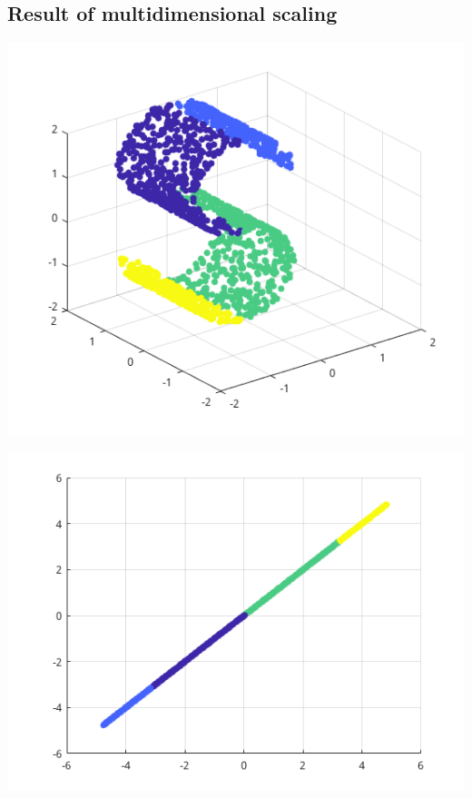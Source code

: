 \documentclass[a0,portrait]{a0poster}
\begin{document}
\begin{multicols}{3}
    \subsection*{Result of multidimensional scaling}

    \begin{minipage}[b]{0.5\linewidth}
        \begin{center}
            \includegraphics[width=\linewidth]{figures/s_curve.png}
        \end{center}
    \end{minipage}
    \begin{minipage}[b]{0.5\linewidth}
        \begin{center}
            \includegraphics[width=\linewidth]{figures/s_curve_result.png}
        \end{center}
    \end{minipage}


\end{multicols}
\end{document}
